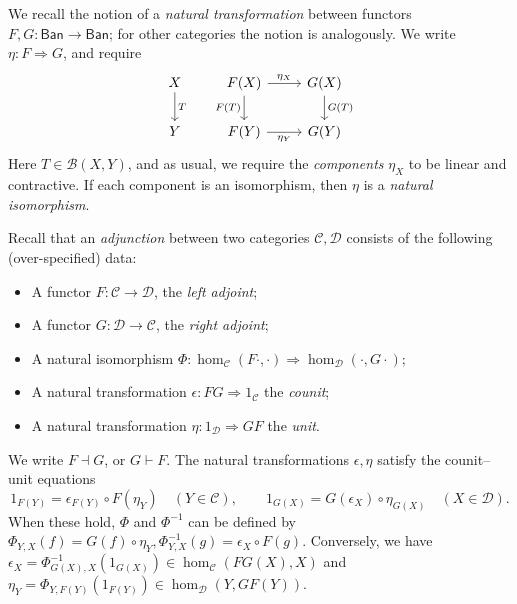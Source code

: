 \documentclass[a4paper,11pt]{article}
\theoremstyle{plain}
\theoremstyle{remark}
\newcommand{\mc}[1]{\mathcal{#1}}
\newcommand{\msf}[1]{\mathsf{#1}}
\begin{document}
We recall the notion of a \emph{natural transformation} between functors $F,G\colon \msf{Ban} \to \msf{Ban}$; for other categories the notion is analogously.  We write $\eta \colon F \Rightarrow G$, and require
\begin{equation}\label{eq:nat_trans}
\begin{tikzcd}
X \arrow[d, "T"]    &
F(X) \arrow[r, "\eta_X"] \arrow[d, "F(T)"'] & G(X) \arrow[d, "G(T)"]
\\
Y    &
F(Y) \arrow[r, "\eta_Y"']  & G(Y)  
\end{tikzcd} \end{equation}
Here $T\in\mc B(X,Y)$, and as usual, we require the \emph{components} $\eta_X$ to be linear and contractive.  If each component is an isomorphism, then $\eta$ is a \emph{natural isomorphism}.

Recall that an \emph{adjunction} between two categories $\mc C, \mc D$ consists of the following (over-specified) data:
\begin{itemize}
  \item A functor $F\colon\mc C\to\mc D$, the \emph{left adjoint};
  \item A functor $G\colon\mc D \to \mc C$, the \emph{right adjoint};
  \item A natural isomorphism $\Phi \colon \hom_{\mc C}(F\cdot, \cdot) \Rightarrow \hom_{\mc D}(\cdot, G\cdot)$;
  \item A natural transformation $\epsilon \colon FG \Rightarrow 1_{\mc C}$ the \emph{counit};
  \item A natural transformation $\eta \colon 1_{\mc D} \Rightarrow GF$ the \emph{unit}.
\end{itemize}
We write $F \dashv G$, or $G \vdash F$.
The natural transformations $\epsilon, \eta$ satisfy the counit--unit equations
\[ 1_{F(Y)} = \epsilon_{F(Y)} \circ F(\eta_Y) \quad (Y\in \mc C), \qquad
1_{G(X)} = G(\epsilon_X) \circ \eta_{G(X)} \quad (X\in\mc D). \]
When these hold, $\Phi$ and $\Phi^{-1}$ can be defined by $\Phi_{Y,X}(f) = G(f)\circ\eta_Y, \Phi^{-1}_{Y,X}(g) = \epsilon_X\circ F(g)$.  Conversely, we have $\epsilon_X = \Phi^{-1}_{G(X), X}(1_{G(X)}) \in \hom_{\mc C}(FG(X), X)$ and $\eta_Y = \Phi_{Y,F(Y)}(1_{F(Y)}) \in \hom_{\mc D}(Y, GF(Y))$.
\end{document}
